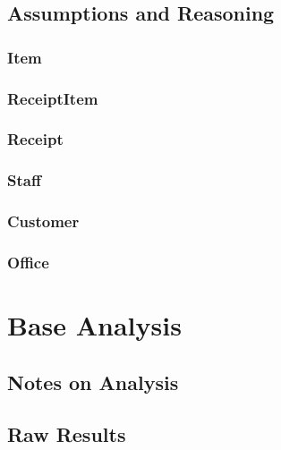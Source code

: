 \documentclass{article}
\begin{document}
        \newpage
        \subsection{Assumptions and Reasoning}
        \label{sec:AR}
            \subsubsection{Item}

            \subsubsection{ReceiptItem}

            \subsubsection{Receipt}

            \subsubsection{Staff}

            \subsubsection{Customer}

            \subsubsection{Office}

    \section{Base Analysis}
    \label{sec:BA}

        \subsection{Notes on Analysis}


            \subsection{Raw Results}
\end{document}

